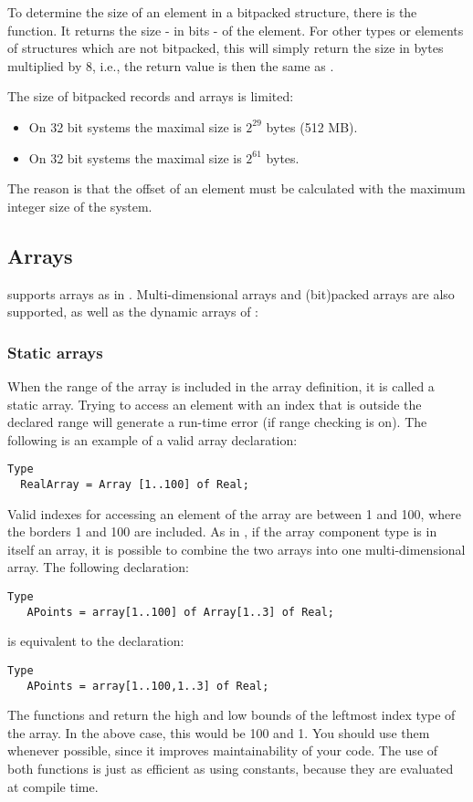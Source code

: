 To determine the size of an element in a bitpacked structure, there is the 
 function. It returns the size - in bits - of the element. 
For other types or elements of structures which are not bitpacked, this will 
simply return the size in bytes multiplied by 8, i.e., the return value is 
then the same as .

The size of bitpacked records and arrays is limited:
\begin{itemize}
\item On 32 bit systems the maximal size is $2^{29}$ bytes (512 MB).
\item On 32 bit systems the maximal size is $2^{61}$ bytes.
\end{itemize}
The reason is that the offset of an element must be calculated with 
the maximum integer size of the system.

%
\subsection{Arrays}
\fpc supports arrays as in \tp. Multi-dimensional arrays and (bit)packed 
arrays are also supported, as well as the dynamic arrays of \delphi:

%
\subsubsection{Static arrays}
When the range of the array is included in the array definition, it is
called a static array. Trying to access an element with an index that is
outside the declared range will generate a run-time error (if range checking
is on).  The following is an example of a valid array declaration:
\begin{verbatim}
Type
  RealArray = Array [1..100] of Real;
\end{verbatim}
Valid indexes for accessing an element of the array are between 1 and 100,
where the borders 1 and 100 are included.
As in \tp, if the array component type is in itself an array, it is
possible to combine the two arrays into one multi-dimensional array. The
following declaration:
\begin{verbatim}
Type
   APoints = array[1..100] of Array[1..3] of Real;
\end{verbatim}
is equivalent to the declaration:
\begin{verbatim}
Type
   APoints = array[1..100,1..3] of Real;
\end{verbatim}
The functions  and  return the high and low bounds of
the leftmost index type of the array. In the above case, this would be 100
and 1. You should use them whenever possible, since it improves maintainability
of your code. The use of both functions is just as efficient as using
constants, because they are evaluated at compile time.

